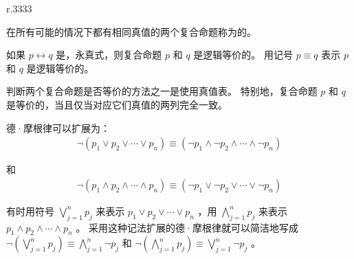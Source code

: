 {{\begin{wraptable}{r}{.3333\textwidth{}}
            \caption{德·摩根律}
        \end{wraptable}

        在所有可能的情况下都有相同真值的两个复合命题称为的。

        \begin{defines}
            如果 $p \leftrightarrow q$ 是，永真式，则复合命题 $p$ 和 $q$ 是逻辑等价的。
            用记号 $p \equiv q$ 表示 $p$ 和 $q$ 是逻辑等价的。
        \end{defines}

        判断两个复合命题是否等价的方法之一是使用真值表。
        特别地，复合命题 $p$ 和 $q$ 是等价的，当且仅当对应它们真值的两列完全一致。

        德·摩根律可以扩展为：
        \begin{align}
            \neg (p_1 \vee p_2 \vee \cdots \vee p_n) \equiv (\neg p_1 \wedge \neg p_2 \wedge \cdots \wedge \neg p_n)
        \end{align}

        和
        \begin{align}
            \neg (p_1 \wedge p_2 \wedge \cdots \wedge p_n) \equiv (\neg p_1 \vee \neg p_2 \vee \cdots \vee \neg p_n)
        \end{align}

        有时用符号 $\bigvee\limits_{j = 1}^n p_j$ 来表示 $p_1 \vee p_2 \vee \cdots \vee p_n$ ，用 $\bigwedge\limits_{j = 1}^n p_j$ 来表示 $p_1 \wedge p_2 \wedge \cdots \wedge p_n$ 。
        采用这种记法扩展的德·摩根律就可以简洁地写成 $\neg (\bigvee\limits_{j = 1}^n p_j) \equiv \bigwedge\limits_{j = 1}^n \neg p_j$ 和 $\neg (\bigwedge\limits_{j = 1}^n p_j) \equiv \bigvee\limits_{j = 1}^n \neg p_j$ 。

        \begin{minipage}[c]{\textwidth{}}
            \begin{minipage}[c]{.6\textwidth{}}
                \begin{table}[H]
                    \centering


\end{table}
\end{minipage}
\end{minipage}}}
